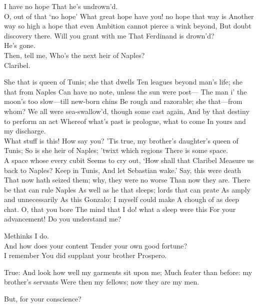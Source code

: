 \documentclass[11pt]{book}
\begin{document}
\8	I have no hope
	That he's undrown'd. \\

\7	O, out of that `no hope'
	What great hope have you! no hope that way is
	Another way so high a hope that even
	Ambition cannot pierce a wink beyond,
	But doubt discovery there. Will you grant with me
	That Ferdinand is drown'd?  \\

\8	He's gone.  \\

\7	Then, tell me,
	Who's the next heir of Naples?  \\

\8	Claribel.

\7	She that is queen of Tunis; she that dwells
	Ten leagues beyond man's life; she that from Naples
	Can have no note, unless the sun were post---
	The man i' the moon's too slow---till new-born chins
	Be rough and razorable; she that---from whom?
	We all were sea-swallow'd, though some cast again,
	And by that destiny to perform an act
	Whereof what's past is prologue, what to come
	In yours and my discharge. \\

\8	What stuff is this!
   How say you?
	'Tis true, my brother's daughter's queen of Tunis;
	So is she heir of Naples; 'twixt which regions
	There is some space. \\

\7	A space whose every cubit
	Seems to cry out, `How shall that Claribel
	Measure us back to Naples? Keep in Tunis,
	And let Sebastian wake.' Say, this were death
	That now hath seized them; why, they were no worse
	Than now they are. There be that can rule Naples
	As well as he that sleeps; lords that can prate
	As amply and unnecessarily
	As this Gonzalo; I myself could make
	A chough of as deep chat. O, that you bore
	The mind that I do! what a sleep were this
	For your advancement! Do you understand me?

\8	Methinks I do. \\

\7	                  And how does your content
	Tender your own good fortune? \\

\8	I remember
	You did supplant your brother Prospero.

\7	True:
	And look how well my garments sit upon me;
	Much feater than before: my brother's servants
	Were then my fellows; now they are my men.

\8	But, for your conscience? \\
\end{document}
